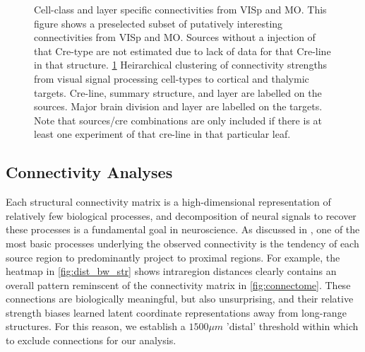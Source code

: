 \newpage

\begin{figure}[H]
    \newline
    
    \caption{ Cell-class and layer specific connectivities from VISp and MO.
    		This figure shows a preselected subset of putatively interesting connectivities from VISp and MO.
		Sources without a injection of that Cre-type are not estimated due to lack of data for that Cre-line in that structure.
    		\ref{fig:data_ct}
		Heirarchical clustering of connectivity strengths from visual signal processing cell-types to cortical and thalymic targets.
		Cre-line, summary structure, and layer are labelled on the sources.
		Major brain division and layer are labelled on the targets.
		Note that sources/cre combinations are only included if there is at least one experiment of that cre-line in that particular leaf.}
\label{fig:data_ct}
\end{figure}

\newpage

\subsection{Connectivity Analyses}

Each structural connectivity matrix is a high-dimensional representation of relatively few biological processes, and decomposition of neural signals to recover these processes is a fundamental goal in neuroscience.
As discussed in \citet{Knox2019-ot}, one of the most basic processes underlying the observed connectivity is the tendency of each source region to predominantly project to proximal regions.
For example, the heatmap in \ref{fig:dist_bw_str} shows intraregion distances clearly contains an overall pattern reminscent of the connectivity matrix in \ref{fig:connectome}.
These connections are biologically meaningful, but also unsurprising, and their relative strength biases learned latent coordinate representations away from long-range structures.
For this reason, we establish a $1500 \mu m$ 'distal' threshold within which to exclude connections for our analysis.

